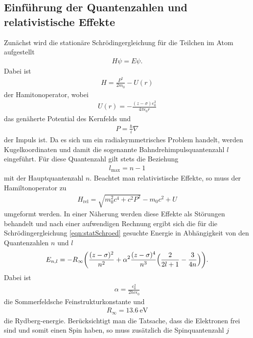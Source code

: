 \subsection{Einführung der Quantenzahlen und relativistische Effekte}

Zunächst wird die stationäre Schrödingergleichung für die Teilchen im Atom
aufgestellt
\begin{align}
  H \psi = E \psi.
  \label{eqn:statSchroed}
\end{align}
Dabei ist
\begin{align}
  H = \frac{P^2}{2 m_0} - U(r)
\end{align}
der Hamitonoperator, wobei
\begin{align}
  U(r) = - \frac{(z-\sigma) e_0^2}{4 \pi \epsilon_0 r}
\end{align}
das genäherte Potential des Kernfelds und
\begin{align}
  P = \frac{\hbar}{i} \nabla
\end{align}
der Impuls ist.
Da es sich um ein radialsymmetrisches Problem handelt, werden Kugelkoordinaten
und damit die sogenannte Bahndrehimpulsquantenzahl $l$ eingeführt. Für diese
Quantenzahl gilt stets die Beziehung
\begin{align}
  l_\text{max} = n-1
\end{align}
mit der Hauptquantenzahl $n$.
Beachtet man relativistische Effekte, so muss der Hamiltonoperator zu
\begin{align}
  H_\text{rel} = \sqrt{m_0^2 c^4 + c^2 P^2} - m_0 c^2 + U
\end{align}
umgeformt werden. In einer Näherung werden diese Effekte als Störungen
behandelt und nach einer aufwendigen Rechnung ergibt sich die für die
Schrödingergleichung \eqref{eqn:statSchroed} gesuchte Energie in Abhängigkeit
von den Quantenzahlen $n$ und $l$
\begin{align}
  E_{n,l} = -R_\infty \biggl(\frac{(z-\sigma)^2}{n^2} + \alpha^2 \frac{(z-\sigma)^4}{n^3}
  \Bigl(\frac{2}{2l+1} - \frac{3}{4n}\Bigr) \biggr).
\end{align}
Dabei ist
\begin{align}
  \alpha = \frac{e_0^2}{2 h c \epsilon_0}
\end{align}
die Sommerfeldsche Feinstrukturkonstante und
\begin{align}
  R_\infty = \SI{13.6}{\electronvolt}
\end{align}
die Rydberg-energie.
Berücksichtigt man die Tatsache, dass die Elektronen frei sind und somit einen
Spin haben, so muss zusätzlich die Spinquantenzahl $j$
